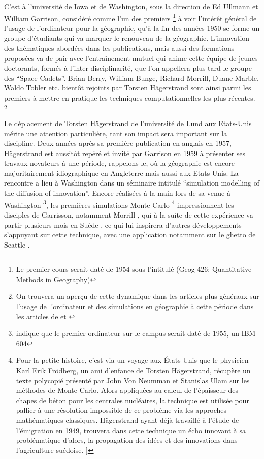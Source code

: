 C'est à l'université de Iowa et de Washington, sous la direction de Ed Ullmann et William Garrison, considéré comme l'un des premiers \footnote {Le premier cours serait daté de 1954 sous l'intitulé (Geog 426: Quantitative Methods in Geography) } à voir l'intérêt général de l'usage de l'ordinateur pour la géographie, qu'à la fin des années 1950 se forme un groupe d'étudiants qui va marquer le renouveau de la géographie. L'innovation des thématiques abordées dans les publications, mais aussi des formations proposées va de pair avec l’entraînement mutuel qui anime cette équipe de jeunes doctorants, formés à l'inter-disciplinarité, que l'on appellera plus tard le groupe des \foreignquote{english}{Space Cadets}. Brian Berry, William Bunge, Richard Morrill, Duane Marble, Waldo Tobler etc. bientôt rejoints par Torsten Hägerstrand sont ainsi parmi les premiers à mettre en pratique les techniques computationnelles les plus récentes. \footnote{ On trouvera un aperçu de cette dynamique dans les articles plus généraux sur l'usage de l'ordinateur et des simulations en géographie à cette période dans les articles de \textcite{Haggett1969} et \textcite{Marble1972}}

Le déplacement de Torsten Hägerstrand de l'université de Lund aux Etats-Unis mérite une attention particulière, tant son impact sera important sur la discipline. Deux années après sa première publication en anglais en 1957, Hägerstrand est aussitôt repéré et invité par Garrison en 1959 à présenter ses travaux novateurs à une période, rappelons le, où la géographie est encore majoritairement idiographique en Angleterre mais aussi aux Etats-Unis. La rencontre a lieu à Washington dans un séminaire intitulé \foreignquote{english}{simulation modelling of the diffusion of innovation}. Encore réalisées à la main lors de sa venue à Washington \footnote{ \textcite{Barnes2006a} indique que le premier ordinateur sur le campus serait daté de 1955, un IBM 604}, les premières simulations Monte-Carlo \footnote{Pour la petite histoire, c'est via un voyage aux États-Unis que le physicien Karl Erik Frödberg, un ami d'enfance de Torsten Hägerstrand, récupère un texte polycopié présenté par John Von Neumman et Stanislas Ulam sur les méthodes de Monte-Carlo. Alors appliquées au calcul de l'épaisseur des chapes de béton pour les centrales nucléaires, la technique est utilisée pour pallier à une résolution impossible de ce problème via les approches mathématiques classiques. Hägerstrand ayant déjà travaillé à l'étude de l'émigration en 1949, trouvera dans cette technique un écho innovant à sa problématique d'alors, la propagation des idées et des innovations dans l'agriculture suédoise. \autocite[26-28]{Gould2004}]} impressionnent les disciples de Garrisson, notamment Morrill \autocite[120]{Unwin1992}, qui à la suite de cette expérience va partir plusieurs mois en Suède \autocite{Morril2005}, ce qui lui inspirera d'autres développements s'appuyant sur cette technique, avec une application notamment sur le ghetto de Seattle \autocite{Marble1972}.

